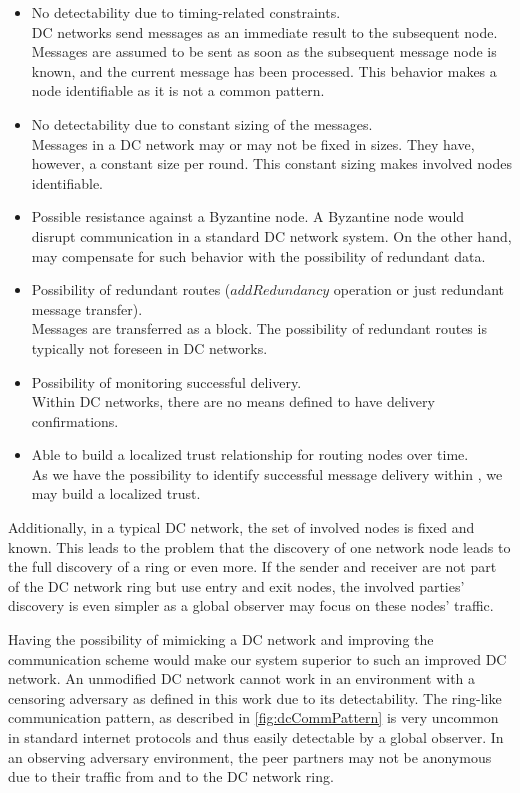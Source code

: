 \begin{itemize}
	\item No detectability due to timing-related constraints.\\
	DC networks send messages as an immediate result to the subsequent node. Messages are assumed to be sent as soon as the subsequent message node is known, and the current message has been processed. This behavior makes a node identifiable as it is not a common pattern.
	\item No detectability due to constant sizing of the messages.\\
	Messages in a DC network may or may not be fixed in sizes. They have, however, a constant size per round. This constant sizing makes involved nodes identifiable.
	\item Possible resistance against a Byzantine node.
	A Byzantine node would disrupt communication in a standard DC network system. On the other hand, \MessageVortex{} may compensate for such behavior with the possibility of redundant data.
	\item Possibility of redundant routes ($addRedundancy$ operation or just redundant message transfer).\\
	Messages are transferred as a block. The possibility of redundant routes is typically not foreseen in DC networks.
	\item Possibility of monitoring successful delivery.\\
	Within DC networks, there are no means defined to have delivery confirmations.
	\item Able to build a localized trust relationship for routing nodes over time.\\
	As we have the possibility to identify successful message delivery within \MessageVortex{}, we may build a localized trust.
\end{itemize}

Additionally, in a typical DC network, the set of involved nodes is fixed and known. This leads to the problem that the discovery of one network node leads to the full discovery of a ring or even more. If the sender and receiver are not part of the DC network ring but use entry and exit nodes, the involved parties' discovery is even simpler as a global observer may focus on these nodes' traffic. 

Having the possibility of mimicking a DC network and improving the communication scheme would make our system superior to such an improved DC network. An unmodified DC network cannot work in an environment with a censoring adversary as defined in this work due to its detectability. The ring-like communication pattern, as described in \cref{fig:dcCommPattern} is very uncommon in standard internet protocols and thus easily detectable by a global observer. In an observing adversary environment, the peer partners may not be anonymous due to their traffic from and to the DC network ring.

